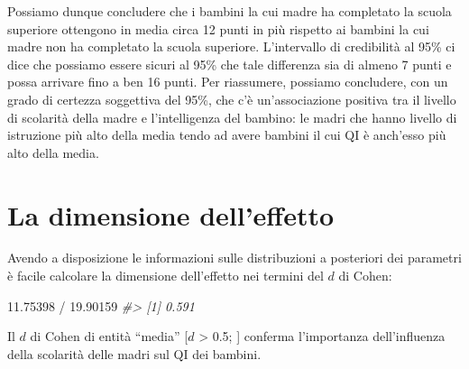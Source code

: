 \documentclass[
  10pt,
  italian,
  a4paper,
  extrafontsizes,onecolumn,openright
  ]{memoir}
\makeatletter
\newenvironment{Shaded}{\begin{snugshade}}{\end{snugshade}}
\newcommand{\CommentTok}[1]{\textcolor[rgb]{0.56,0.35,0.01}{\textit{#1}}}
\newcommand{\FloatTok}[1]{\textcolor[rgb]{0.00,0.00,0.81}{#1}}
\newcommand{\SpecialCharTok}[1]{\textcolor[rgb]{0.00,0.00,0.00}{#1}}
\newcommand{\MemoirChapStyle}{daleif1}
\newcommand{\MemoirPageStyle}{Ruled}
\newlength\widthw %
\newcommand*{\SmallMargins}{
  \setlrmarginsandblock{1.5in}{1.5in}{*}
  \setmarginnotes{0.1in}{0.1in}{0.1in}
 \setulmarginsandblock{1.5in}{1in}{*}
  \checkandfixthelayout
  \ch@ngetext
  \clearpage
  \setlength{\widthw}{\textwidth+\marginparsep+\marginparwidth}
  \footnotesatfoot
  \chapterstyle{\MemoirChapStyle}  %
  \pagestyle{\MemoirPageStyle}
}
\newcommand{\LargeMargins}{\SmallMargins}
\makeatother
\begin{document}
Possiamo dunque concludere che i bambini la cui madre ha completato la scuola superiore ottengono in media circa 12 punti in più rispetto ai bambini la cui madre non ha completato la scuola superiore. L'intervallo di credibilità al 95\% ci dice che possiamo essere sicuri al 95\% che tale differenza sia di almeno 7 punti e possa arrivare fino a ben 16 punti. Per riassumere, possiamo concludere, con un grado di certezza soggettiva del 95\%, che c'è un'associazione positiva tra il livello di scolarità della madre e l'intelligenza del bambino: le madri che hanno livello di istruzione più alto della media tendo ad avere bambini il cui QI è anch'esso più alto della media.

\hypertarget{la-dimensione-delleffetto}{%
\section{La dimensione dell'effetto}\label{la-dimensione-delleffetto}}

Avendo a disposizione le informazioni sulle distribuzioni a posteriori dei parametri è facile calcolare la dimensione dell'effetto nei termini del \(d\) di Cohen:

\begin{Shaded}
\begin{Highlighting}[]
\FloatTok{11.75398} \SpecialCharTok{/} \FloatTok{19.90159} 
\CommentTok{\#\textgreater{} [1] 0.591}
\end{Highlighting}
\end{Shaded}

\noindent
Il \(d\) di Cohen di entità ``media'' {[}\(d\) \textgreater{} 0.5; \textcite{sawilowsky2009new}{]} conferma l'importanza dell'influenza della scolarità delle madri sul QI dei bambini.



\backmatter
\SmallMargins

\printbibliography
\onecolumn




\cleardoublepage
\LargeMargins
\listoffigures






\end{document}
